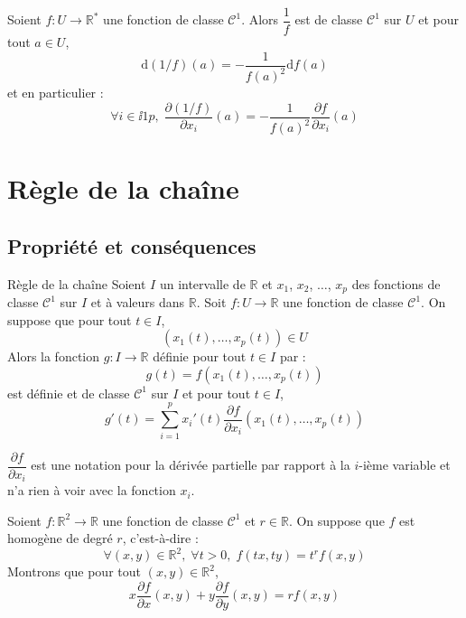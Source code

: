 \documentclass[french,11pt,twoside]{VcCours}
\begin{document}
\begin{Proposition}{} Soient $f : U \rightarrow \mathbb{R}^*$ une fonction de classe $\mathcal{C}^1$. Alors $\dfrac{1}{f}$ est de classe $\mathcal{C}^1$ sur $U$ et pour tout $a \in U$,
$$\textrm{d}(1/f)(a) = - \dfrac{1}{f(a)^2} \textrm{d}f(a)$$
et en particulier :
$$ \forall i \in \ii{1}{p}, \; \dfrac{\partial (1/f)}{\partial x_i}(a) = - \dfrac{1}{f(a)^2} \dfrac{\partial f }{\partial x_i}(a)$$
\end{Proposition}



\section{Règle de la chaîne}
\subsection{Propriété et conséquences}
\begin{Theoreme}{Règle de la chaîne} Soient $I$ un intervalle de $\mathbb{R}$ et $x_1$, $x_2$, $\ldots$, $x_p$ des fonctions de classe $\mathcal{C}^1$ sur $I$ et à valeurs dans $\mathbb{R}$. Soit $f : U \rightarrow \mathbb{R}$ une fonction de classe $\mathcal{C}^1$. On suppose que pour tout $t \in I$,
$$ (x_1(t), \ldots, x_p(t)) \in U$$
Alors la fonction $g : I \rightarrow \mathbb{R}$ définie pour tout $t \in I$ par :
$$ g(t)=f(x_1(t), \ldots, x_p(t))$$
est définie et de classe $\mathcal{C}^1$ sur $I$ et pour tout $t \in I$,
$$ g'(t) = \sum_{i=1}^p x_i'(t) \dfrac{\partial f}{\partial x_i}(x_1(t), \ldots, x_p(t))$$
\end{Theoreme}

\medskip

\begin{Remarque}[\alerte]{} $\dfrac{\partial f}{\partial x_i}$ est une notation pour la dérivée partielle par rapport à la $i$-ième variable et n'a rien à voir avec la fonction $x_i$.
\end{Remarque}

\medskip

\begin{Exemple}{} Soient $f : \mathbb{R}^2 \rightarrow \mathbb{R}$ une fonction de classe $\mathcal{C}^1$ et $r \in \mathbb{R}$. On suppose que $f$ est homogène de degré $r$, c'est-à-dire :
$$ \forall (x,y) \in \mathbb{R}^2, \; \forall t >0, \; f(tx,ty) = t^r f(x,y)$$
Montrons que pour tout $(x,y) \in \mathbb{R}^2$,
$$ x \dfrac{\partial f}{\partial x}(x,y) + y \dfrac{\partial f}{\partial y}(x,y) =r f(x,y)$$


\end{Exemple}
\newpage
\end{document}
